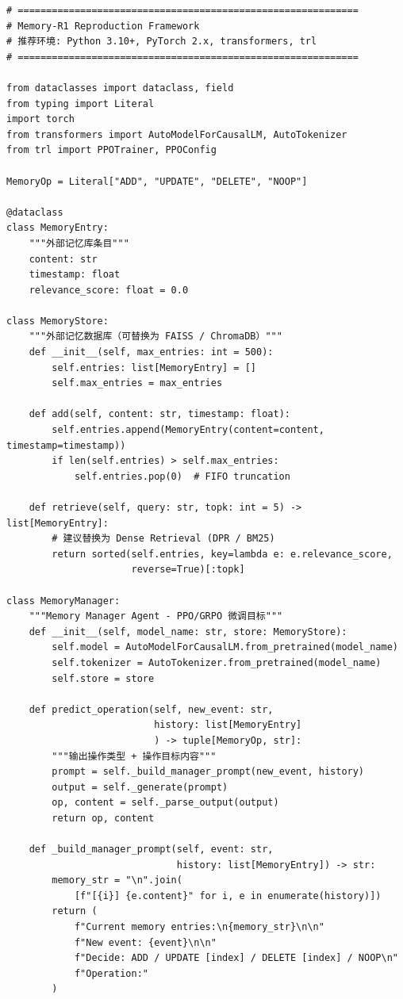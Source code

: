 \documentclass[11pt,a4paper]{article}
\begin{document}
\begin{lstlisting}[style=pythonstyle, caption={Memory-R1 核心组件伪代码}]
# ============================================================
# Memory-R1 Reproduction Framework
# 推荐环境: Python 3.10+, PyTorch 2.x, transformers, trl
# ============================================================

from dataclasses import dataclass, field
from typing import Literal
import torch
from transformers import AutoModelForCausalLM, AutoTokenizer
from trl import PPOTrainer, PPOConfig

MemoryOp = Literal["ADD", "UPDATE", "DELETE", "NOOP"]

@dataclass
class MemoryEntry:
    """外部记忆库条目"""
    content: str
    timestamp: float
    relevance_score: float = 0.0

class MemoryStore:
    """外部记忆数据库（可替换为 FAISS / ChromaDB）"""
    def __init__(self, max_entries: int = 500):
        self.entries: list[MemoryEntry] = []
        self.max_entries = max_entries

    def add(self, content: str, timestamp: float):
        self.entries.append(MemoryEntry(content=content, timestamp=timestamp))
        if len(self.entries) > self.max_entries:
            self.entries.pop(0)  # FIFO truncation

    def retrieve(self, query: str, topk: int = 5) -> list[MemoryEntry]:
        # 建议替换为 Dense Retrieval (DPR / BM25)
        return sorted(self.entries, key=lambda e: e.relevance_score,
                      reverse=True)[:topk]

class MemoryManager:
    """Memory Manager Agent - PPO/GRPO 微调目标"""
    def __init__(self, model_name: str, store: MemoryStore):
        self.model = AutoModelForCausalLM.from_pretrained(model_name)
        self.tokenizer = AutoTokenizer.from_pretrained(model_name)
        self.store = store

    def predict_operation(self, new_event: str,
                          history: list[MemoryEntry]
                          ) -> tuple[MemoryOp, str]:
        """输出操作类型 + 操作目标内容"""
        prompt = self._build_manager_prompt(new_event, history)
        output = self._generate(prompt)
        op, content = self._parse_output(output)
        return op, content

    def _build_manager_prompt(self, event: str,
                              history: list[MemoryEntry]) -> str:
        memory_str = "\n".join(
            [f"[{i}] {e.content}" for i, e in enumerate(history)])
        return (
            f"Current memory entries:\n{memory_str}\n\n"
            f"New event: {event}\n\n"
            f"Decide: ADD / UPDATE [index] / DELETE [index] / NOOP\n"
            f"Operation:"
        )


\end{lstlisting}
\end{document}
